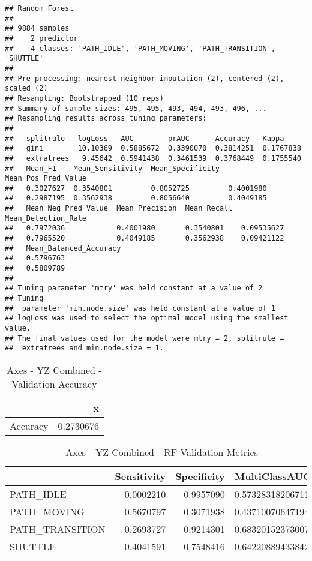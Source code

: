 \documentclass[]{article}
\begin{document}
\begin{verbatim}
## Random Forest 
## 
## 9884 samples
##    2 predictor
##    4 classes: 'PATH_IDLE', 'PATH_MOVING', 'PATH_TRANSITION', 'SHUTTLE' 
## 
## Pre-processing: nearest neighbor imputation (2), centered (2), scaled (2) 
## Resampling: Bootstrapped (10 reps) 
## Summary of sample sizes: 495, 495, 493, 494, 493, 496, ... 
## Resampling results across tuning parameters:
## 
##   splitrule   logLoss   AUC        prAUC      Accuracy   Kappa    
##   gini        10.10369  0.5885672  0.3390070  0.3814251  0.1767838
##   extratrees   9.45642  0.5941438  0.3461539  0.3768449  0.1755540
##   Mean_F1    Mean_Sensitivity  Mean_Specificity  Mean_Pos_Pred_Value
##   0.3027627  0.3540801         0.8052725         0.4001980          
##   0.2987195  0.3562938         0.8056640         0.4049185          
##   Mean_Neg_Pred_Value  Mean_Precision  Mean_Recall  Mean_Detection_Rate
##   0.7972036            0.4001980       0.3540801    0.09535627         
##   0.7965520            0.4049185       0.3562938    0.09421122         
##   Mean_Balanced_Accuracy
##   0.5796763             
##   0.5809789             
## 
## Tuning parameter 'mtry' was held constant at a value of 2
## Tuning
##  parameter 'min.node.size' was held constant at a value of 1
## logLoss was used to select the optimal model using the smallest value.
## The final values used for the model were mtry = 2, splitrule =
##  extratrees and min.node.size = 1.
\end{verbatim}

\begin{table}[!h]

\caption{\label{tab:sensor-yz-combined-rf-results}Axes - YZ Combined - Validation Accuracy}
\centering
\begin{tabular}[t]{lr}
\toprule
  & x\\
\midrule
Accuracy & 0.2730676\\
\bottomrule
\end{tabular}
\end{table}

\begin{table}[!h]

\caption{\label{tab:sensor-yz-combined-rf-results}Axes - YZ Combined - RF Validation Metrics}
\centering
\begin{tabular}[t]{lrrl}
\toprule
  & Sensitivity & Specificity & MultiClassAUC\\
\midrule
PATH\_IDLE & 0.0002210 & 0.9957090 & 0.573283182067118\\
PATH\_MOVING & 0.5670797 & 0.3071938 & 0.437100706471942\\
PATH\_TRANSITION & 0.2693727 & 0.9214301 & 0.683201523730074\\
SHUTTLE & 0.4041591 & 0.7548416 & 0.642208894338427\\
\bottomrule
\end{tabular}
\end{table}
\end{document}
